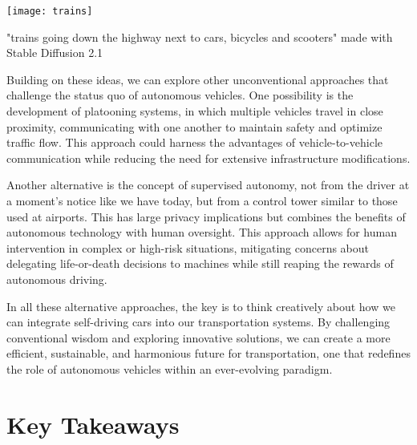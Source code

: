 \begin{pdf}
\begin{pdf}
\begin{pdf}
\begin{marginfigure}[-5.5cm]
        \texttt{[image: trains]}
        \caption{"trains going down the highway next to cars, bicycles and scooters" made with Stable Diffusion 2.1}
\end{marginfigure}
\end{pdf}

Building on these ideas, we can explore other unconventional approaches that challenge the status quo of autonomous vehicles. One possibility is the development of platooning systems, in which multiple vehicles travel in close proximity, communicating with one another to maintain safety and optimize traffic flow. This approach could harness the advantages of vehicle-to-vehicle communication while reducing the need for extensive infrastructure modifications.

Another alternative is the concept of supervised autonomy, not from the driver at a moment's notice like we have today, but from a control tower similar to those used at airports. This has large privacy implications but combines the benefits of autonomous technology with human oversight. This approach allows for human intervention in complex or high-risk situations, mitigating concerns about delegating life-or-death decisions to machines while still reaping the rewards of autonomous driving.

In all these alternative approaches, the key is to think creatively about how we can integrate self-driving cars into our transportation systems. By challenging conventional wisdom and exploring innovative solutions, we can create a more efficient, sustainable, and harmonious future for transportation, one that redefines the role of autonomous vehicles within an ever-evolving paradigm.

\section{Key Takeaways}


\end{pdf}
\end{pdf}

